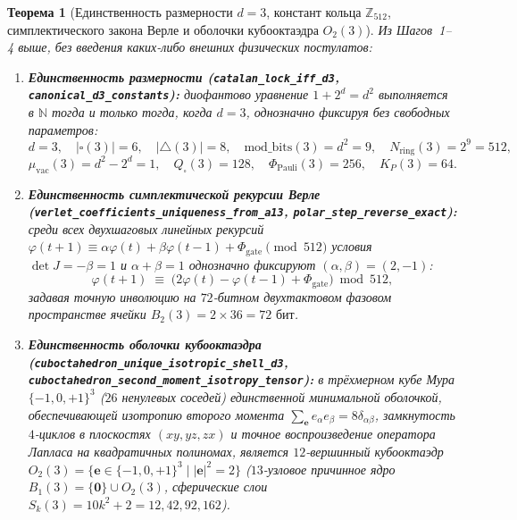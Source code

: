 \documentclass[11pt,a4paper]{article}
\theoremstyle{plain}
\newtheorem{theorem}{Теорема}[section]
\theoremstyle{definition}
\begin{document}
\begin{theorem}[Единственность размерности $d=3$, констант кольца $\mathbb{Z}_{512}$, симплектического закона Верле и оболочки кубооктаэдра $O_2(3)$]
\label{thm:d3-verlet-cuboct}
Из Шагов~1--4 выше, без введения каких-либо внешних физических постулатов:
\begin{enumerate}[label=\textbf{(\roman*)},leftmargin=*]
\item \textbf{Единственность размерности (\texttt{catalan\_lock\_iff\_d3}, \texttt{canonical\_d3\_constants}):}
  диофантово уравнение $1 + 2^d = d^2$ выполняется в $\mathbb{N}$ тогда и только тогда, когда $d = 3$, однозначно фиксируя без свободных параметров:
  \[
    d = 3,\quad |\square(3)| = 6,\quad |{\triangle}(3)| = 8,\quad \mathrm{mod\_bits}(3) = d^2 = 9,\quad N_{\mathrm{ring}}(3) = 2^9 = 512,
  \]
  \[
    \mu_{\mathrm{vac}}(3) = d^2 - 2^d = 1,\quad Q_\square(3) = 128,\quad \Phi_{\mathrm{Pauli}}(3) = 256,\quad K_P(3) = 64.
  \]
\item \textbf{Единственность симплектической рекурсии Верле (\texttt{verlet\_coefficients\_uniqueness\_from\_a13}, \texttt{polar\_step\_reverse\_exact}):}
  среди всех двухшаговых линейных рекурсий $\varphi(t+1)\equiv \alpha\varphi(t)+\beta\varphi(t-1)+\Phi_{\mathrm{gate}}\pmod{512}$ условия $\det J = -\beta = 1$ и $\alpha+\beta = 1$ однозначно фиксируют $(\alpha,\beta) = (2,-1)$:
  \begin{equation}
    \label{eq:verlet-law}
    \varphi(t+1) \;\equiv\; \bigl(2\varphi(t) - \varphi(t-1) + \Phi_{\mathrm{gate}}\bigr) \bmod 512,
  \end{equation}
  задавая точную инволюцию на $72$-битном двухтактовом фазовом пространстве ячейки $B_2(3) = 2\times 36 = 72\text{ бит}$.
\item \textbf{Единственность оболочки кубооктаэдра (\texttt{cuboctahedron\_unique\_isotropic\_shell\_d3}, \texttt{cuboctahedron\_second\_moment\_isotropy\_tensor}):}
  в трёхмерном кубе Мура $\{-1,0,+1\}^3$ ($26$ ненулевых соседей) единственной минимальной оболочкой, обеспечивающей изотропию второго момента $\sum_{\mathbf{e}} e_\alpha e_\beta = 8\delta_{\alpha\beta}$, замкнутость $4$-циклов в плоскостях $(xy,yz,zx)$ и точное воспроизведение оператора Лапласа на квадратичных полиномах, является $12$-вершинный кубооктаэдр $O_2(3) = \{\mathbf{e}\in\{-1,0,+1\}^3\mid |\mathbf{e}|^2 = 2\}$ ($13$-узловое причинное ядро $B_1(3) = \{\mathbf{0}\}\cup O_2(3)$, сферические слои $S_k(3) = 10k^2 + 2 = 12,42,92,162$).
\end{enumerate}
\end{theorem}
\end{document}
